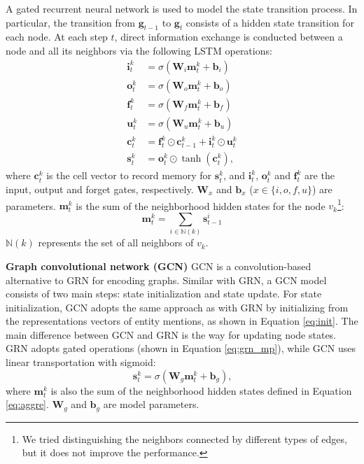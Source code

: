 \documentclass[letterpaper]{article}
\begin{document}
A gated recurrent neural network is used to model the state transition process. 
In particular, the transition from $\boldsymbol{g}_{t-1}$ to $\boldsymbol{g}_t$ consists of a hidden state transition for each node.
At each step $t$, direct information exchange is conducted between a node and all its neighbors via the following LSTM \citep{hochreiter1997long} operations:
\begin{equation} \label{eq:grn_mp}
\begin{split}
\boldsymbol{i}_t^k &= \sigma (\boldsymbol{W}_i \boldsymbol{m}_{t}^k + \boldsymbol{b}_i) \\
\boldsymbol{o}_t^k &= \sigma (\boldsymbol{W}_o \boldsymbol{m}_{t}^k + \boldsymbol{b}_o) \\
\boldsymbol{f}_t^k &= \sigma (\boldsymbol{W}_f \boldsymbol{m}_{t}^k + \boldsymbol{b}_f) \\
\boldsymbol{u}_t^k &= \sigma (\boldsymbol{W}_u \boldsymbol{m}_{t}^k + \boldsymbol{b}_u) \\
\boldsymbol{c}_t^k &= \boldsymbol{f}_t^k \odot \boldsymbol{c}_{t-1}^k + \boldsymbol{i}_t^k \odot \boldsymbol{u}_t^k \\
\boldsymbol{s}_t^k &= \boldsymbol{o}_t^k \odot \tanh(\boldsymbol{c}_t^k) \textrm{,}
\end{split}
\end{equation}
where $\boldsymbol{c}_t^k$ is the cell vector to record memory for $\boldsymbol{s}_t^k$, and $\boldsymbol{i}_t^k$, $\boldsymbol{o}_t^k$ and $\boldsymbol{f}_t^k$ are the input, output and forget gates, respectively. 
$\boldsymbol{W}_x$ and $\boldsymbol{b}_x$ ($x\in \{i,o,f,u\}$) are parameters.
$\boldsymbol{m}_{t}^k$ is the sum of the neighborhood hidden states for the node $v_k$\footnote{We tried distinguishing the neighbors connected by different types of edges, but it does not improve the performance.}:
\begin{equation} \label{eq:aggre}
\boldsymbol{m}_{t}^k = \sum_{i \in \mathbb{N}(k)} \boldsymbol{s}_{t-1}^i
\end{equation}
$\mathbb{N}(k)$ represents the set of all neighbors of $v_k$.


\vspace{0.5em}
\textbf{Graph convolutional network (GCN)} 
GCN 
is a convolution-based alternative to GRN for encoding graphs.
Similar with GRN, a GCN model consists of two main steps: state initialization and state update.
For state initialization, GCN adopts the same approach as with GRN by initializing from the representations vectors of entity mentions, as shown in Equation \ref{eq:init}.
The main difference between GCN and GRN is the way for updating node states.
GRN adopts gated operations (shown in Equation \ref{eq:grn_mp}), while GCN uses linear transportation with sigmoid:
\begin{equation}
\boldsymbol{s}_t^k = \sigma (\boldsymbol{W}_g \boldsymbol{m}_{t}^k + \boldsymbol{b}_g) \textrm{,} 
\end{equation}
where $\boldsymbol{m}_{t}^k$ is also the sum of the neighborhood hidden states defined in Equation \ref{eq:aggre}. 
$\boldsymbol{W}_g$ and $\boldsymbol{b}_g$ are model parameters.
\end{document}

